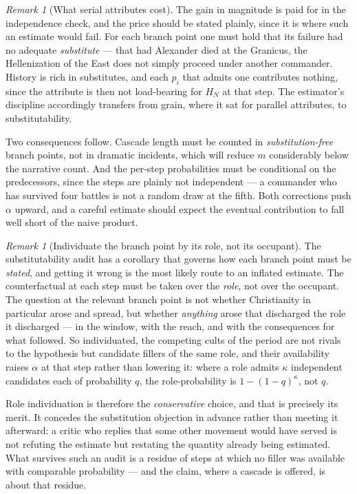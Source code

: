 \documentclass[11pt]{article}
\numberwithin{equation}{section}
\theoremstyle{plain}
\theoremstyle{definition}
\theoremstyle{remark}
\newtheorem{remark}[theorem]{Remark}
\begin{document}
\begin{remark}[What serial attributes cost]\label{gc:rem:serialcost}
The gain in magnitude is paid for in the independence check, and the
price should be stated plainly, since it is where such an estimate would
fail. For each branch point one must hold that its failure had no adequate
\emph{substitute} --- that had Alexander died at the Granicus, the
Hellenization of the East does not simply proceed under another
commander. History is rich in substitutes, and each $p_i$ that admits
one contributes nothing, since the attribute is then not load-bearing
for $H_N$ at that step. The estimator's discipline accordingly transfers
from grain, where it sat for parallel attributes, to substitutability.

Two consequences follow. Cascade length must be counted in
\emph{substitution-free} branch points, not in dramatic incidents, which
will reduce $m$ considerably below the narrative count. And the
per-step probabilities must be conditional on the predecessors, since
the steps are plainly not independent --- a commander who has survived
four battles is not a random draw at the fifth. Both corrections push
$\alpha$ upward, and a careful estimate should expect the eventual
contribution to fall well short of the naive product.

\begin{remark}[Individuate the branch point by its role, not its
occupant]\label{gc:rem:roleindividuation}
The substitutability audit has a corollary that governs how each branch
point must be \emph{stated}, and getting it wrong is the most likely
route to an inflated estimate. The counterfactual at each step must be taken over the \emph{role}, not
over the occupant. The question at the relevant branch point is not
whether Christianity in particular arose and spread, but whether
\emph{anything} arose that discharged the role it discharged --- in the
window, with the reach, and with the consequences for what followed. So
individuated, the competing cults of the period are not rivals to the
hypothesis but candidate fillers of the same role, and their availability
raises $\alpha$ at that step rather than lowering it: where a role admits
$\kappa$ independent candidates each of probability $q$, the
role-probability is $1-(1-q)^{\kappa}$, not $q$.

Role individuation is therefore the \emph{conservative} choice, and that
is precisely its merit. It concedes the substitution objection in
advance rather than meeting it afterward: a critic who replies that some
other movement would have served is not refuting the estimate but
restating the quantity already being estimated. What survives such an
audit is a residue of steps at which no filler was available with
comparable probability --- and the claim, where a cascade is offered, is
about that residue.


\end{remark}
\end{remark}
\end{document}
